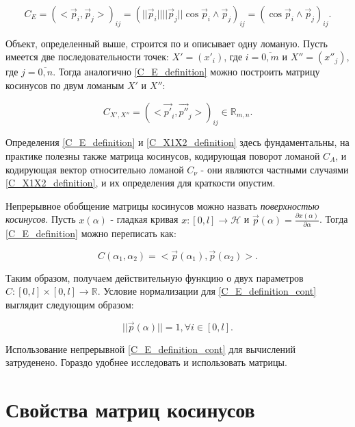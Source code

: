 \begin{equation}
	{C}_{E} = {(<\vec{p}_{i}, \vec{p}_{j}>)}_{ij} = {(||\vec{p}_{i}|| ||\vec{p}_{j}|| \cos{\vec{p}_{i} \wedge \vec{p}_{j}})}_{ij} = {(\cos{\vec{p}_{i} \wedge \vec{p}_{j}})}_{ij}.
	\label{name_cosine}
\end{equation}

Объект, определенный выше, строится по и описывает одну ломаную. Пусть имеется две последовательности точек: $X' = ({x'}_{i})$, где $i = \overline{0,m}$ и $X'' = ({x''}_{j})$, где $j = \overline{0,n}$. Тогда аналогично \ref{C_E_definition} можно построить матрицу косинусов по двум ломаным $X'$ и $X''$:

\begin{equation}
	{C}_{X',X''} = {(<\vec{p'}_{i}, \vec{p''}_{j}>)}_{ij} \in \mathbb{R}_{m,n}.
	\label{C_X1X2_definition}
\end{equation}

Определения \ref{C_E_definition} и \ref{C_X1X2_definition} здесь фундаментальны, на практике полезны также матрица косинусов, кодирующая поворот ломаной $C_A$, и кодирующая вектор относительно ломаной ${C}_{\nu}$ - они являются частными случаями \ref{C_X1X2_definition}, и их определения для краткости опустим.

Непрерывное обобщение матрицы косинусов можно назвать \textit{поверхностью косинусов}. Пусть $x(\alpha)$ - гладкая кривая $x : [0, l] \rightarrow \mathcal{H}$ и $\vec{p}(\alpha) = \frac{\partial{x(\alpha)}}{\partial{\alpha}}$. Тогда \ref{C_E_definition} можно переписать как:

\begin{equation}
	C({\alpha}_1, {\alpha}_2) = <\vec{p}(\alpha_1), \vec{p}(\alpha_2)>.
	\label{C_E_definition_cont}
\end{equation}

Таким образом, получаем действительную функцию о двух параметров $C : [0, l] \times [0, l] \rightarrow \mathbb{R}$.
Условие нормализации для \ref{C_E_definition_cont} выглядит следующим образом:

\begin{equation}
	||\vec{p}(\alpha)|| = 1, \forall{i} \in [0, l].
	\label{normalized_definition_cont}
\end{equation}

Использование непрерывной \ref{C_E_definition_cont} для вычислений затруденено. Гораздо удобнее исследовать и использовать матрицы.

\section{Свойства матриц косинусов}

